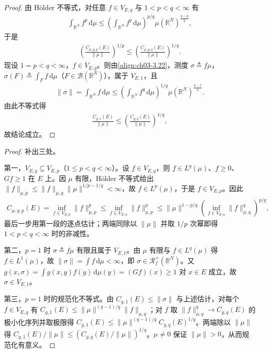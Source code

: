 \documentclass[../../main.tex]{subfiles}%
\begin{document}
\begin{proof}
由 Hölder 不等式，对任意 $f\in V_{E,q}$ 与 $1<p<q<\infty$ 有
\begin{align*}
\int_{\mathbb{R}^N}f^p\,\mathrm{d}\mu\leqslant\left(\int_{\mathbb{R}^N}f^q\,\mathrm{d}\mu\right)^{p/q}\mu(\mathbb{R}^N)^{\frac{q-p}{q}},
\end{align*}
于是
\begin{align*}
\left(\frac{C_{\mu,g,p}(E)}{\|\mu\|}\right)^{1/p}\leqslant\left(\frac{C_{\mu,g,q}(E)}{\|\mu\|}\right)^{1/q}.
\end{align*}
现设 $1=p<q<\infty$，$f\in V_{E,q}$。则由\eqref{align:ch03-3.22}，测度 $\sigma\triangleq f\mu$，$\sigma(F)\triangleq\int_Ff\,\mathrm{d}\mu$（$F\in\mathcal{B}(\mathbb{R}^N)$），属于 $V_{E,1}$，且
\begin{align*}
\|\sigma\|=\int_{\mathbb{R}^N}f\,\mathrm{d}\mu\leqslant\left(\int_{\mathbb{R}^N}f^q\,\mathrm{d}\mu\right)^{1/q}\mu(\mathbb{R}^N)^{\frac{q-1}{q}}.
\end{align*}
由此不等式得
\begin{align*}
\frac{C_{g,1}(E)}{\|\mu\|}\leqslant\left(\frac{C_{g,q}(E)}{\|\mu\|}\right)^{1/q},
\end{align*}
故结论成立。
\end{proof}

\begin{proof}
补出三处。

第一，$V_{E,q}\subseteq V_{E,p}$（$1\leqslant p<q<\infty$）。设 $f\in V_{E,q}$，则 $f\in L^q(\mu)$、$f\geqslant0$、$Gf\geqslant1$ 在 $E$ 上。因 $\mu$ 有限，Hölder 不等式给出 $\|f\|_{\mu,p}\leqslant\|f\|_{\mu,q}\|\mu\|^{1/p-1/q}<\infty$，故 $f\in L^p(\mu)$，于是 $f\in V_{E,p}$。因此
\begin{align*}
C_{\mu,g,p}(E)=\inf_{f\in V_{E,p}}\|f\|_{\mu,p}^p\leqslant\inf_{f\in V_{E,q}}\|f\|_{\mu,p}^p\leqslant\|\mu\|^{1-p/q}\left(\inf_{f\in V_{E,q}}\|f\|_{\mu,q}^q\right)^{p/q},
\end{align*}
最后一步用第一段的逐点估计；两端同除以 $\|\mu\|$ 并取 $1/p$ 次幂即得 $1<p<q<\infty$ 时的非减性。

第二，$p=1$ 时 $\sigma\triangleq f\mu$ 有限且属于 $V_{E,1}$。由 $\mu$ 有限与 $f\in L^q(\mu)$ 得 $f\in L^1(\mu)$，故 $\|\sigma\|=\int f\,\mathrm{d}\mu<\infty$，即 $\sigma\in\mathscr{R}^+_f(\mathbb{R}^N)$。又 $g(x,\sigma)=\int g(x,y)f(y)\,\mathrm{d}\mu(y)=(Gf)(x)\geqslant1$ 对 $x\in E$ 成立，故 $\sigma\in V_{E,1}$。

第三，$p=1$ 时的规范化不等式。由 $C_{g,1}(E)\leqslant\|\sigma\|$ 与上述估计，对每个 $f\in V_{E,q}$ 有 $C_{g,1}(E)\leqslant\|\mu\|^{(q-1)/q}\|f\|_{\mu,q}$；对 $f$ 取 $\|f\|_{\mu,q}^q\to C_{g,q}(E)$ 的极小化序列并取极限得 $C_{g,1}(E)\leqslant\|\mu\|^{(q-1)/q}C_{g,q}(E)^{1/q}$。两端除以 $\|\mu\|$ 得 $C_{g,1}(E)/\|\mu\|\leqslant(C_{g,q}(E)/\|\mu\|)^{1/q}$。$\mu\neq0$ 保证 $\|\mu\|>0$，从而规范化有意义。
\end{proof}
\end{document}
